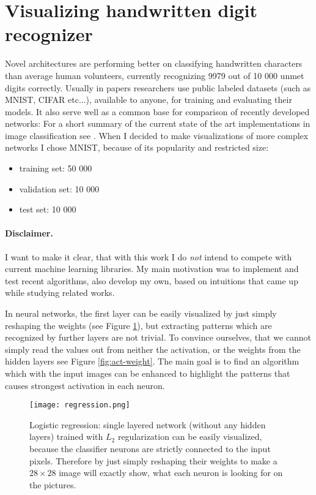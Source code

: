 \clearpage
\section{Visualizing handwritten digit recognizer}\label{sec:MNIST}
Novel architectures are performing better on classifying handwritten characters than average human volunteers, currently recognizing 9979 out of 10 000 unmet digits correctly. 
Usually in papers researchers use public labeled datasets (such as MNIST\cite{mnist}, CIFAR\cite{cifar} etc...), available to anyone, for training and evaluating their models.
It also serve well as a common base for comparison of recently developed networks: 
For a short summary of the current state of the art implementations in image classification see \cite{bestmnist}.
When I decided to make visualizations of more complex networks I chose MNIST, because of its popularity and restricted size: 
\begin{itemize}
\item[] training set: 50 000
\item[] validation set: 10 000
\item[] test set: 10 000
\end{itemize}

\paragraph{Disclaimer.} I want to make it clear, that with this work I do \emph{not} intend to compete with current machine learning libraries.
My main motivation was to implement and test recent algorithms, also develop my own, based on intuitions that came up while studying related works.

In neural networks, the first layer can be easily visualized by just simply reshaping the weights (see Figure \ref{fig:regression}), 
but extracting patterns which are recognized by further layers are not trivial. 
To convince ourselves, that we cannot simply read the values out from neither the activation, or the weights from the hidden layers see Figure \ref{fig:act-weight}.
The main goal is to find an algorithm which with the input images can be 
enhanced to highlight the patterns that causes strongest activation in each neuron.


\begin{figure}
    \centering
    \texttt{[image: regression.png]}
    \caption{Logistic regression: single layered network (without any hidden layers) trained with $L_2$ regularization can be easily visualized, because the classifier neurons are strictly connected to the input pixels. Therefore by just simply reshaping their weights to make a $28 \times 28$ image will exactly show, what each neuron is looking for on the pictures.}
    \label{fig:regression}
\end{figure}

